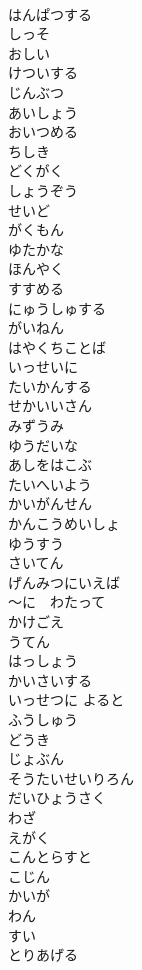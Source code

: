 \documentclass[8pt]{extreport}
\begin{document}
\begin{CJK}{UTF8}{min}
\\	はんぱつする
\\	しっそ
\\	おしい
\\	けついする
\\	じんぶつ
\\	あいしょう
\\	おいつめる
\\	ちしき
\\	どくがく
\\	しょうぞう
\\	せいど
\\	がくもん
\\	ゆたかな
\\	ほんやく
\\	すすめる
\\	にゅうしゅする
\\	がいねん
\\	はやくちことば
\\	いっせいに
\\	たいかんする
\\	せかいいさん
\\	みずうみ
\\	ゆうだいな
\\	あしをはこぶ
\\	たいへいよう
\\	かいがんせん
\\	かんこうめいしょ
\\	ゆうすう
\\	さいてん
\\	げんみつにいえば
\\	～に　わたって
\\	かけごえ
\\	うてん
\\	はっしょう
\\	かいさいする
\\	いっせつに よると
\\	ふうしゅう
\\	どうき
\\	じょぶん
\\	そうたいせいりろん
\\	だいひょうさく
\\	わざ
\\	えがく
\\	こんとらすと
\\	こじん
\\	かいが
\\	わん
\\	すい
\\	とりあげる

\end{CJK}
\end{document}
